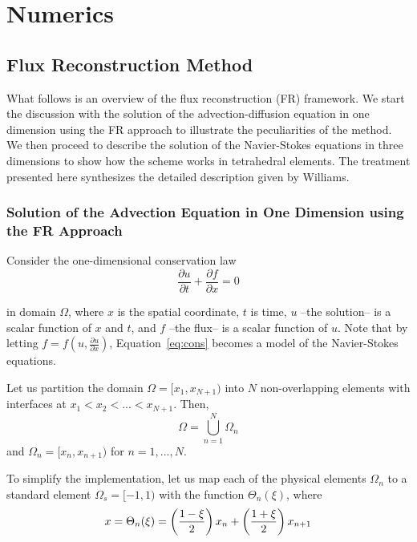
\section{Numerics}
\label{sec:numerics}
\subsection{Flux Reconstruction Method}

What follows is an overview of the flux reconstruction (FR) framework. We start the discussion with the solution of the advection-diffusion equation in one dimension using the FR approach to illustrate the peculiarities of the method. We then proceed to describe the solution of the Navier-Stokes equations in  three dimensions to show how the scheme works in tetrahedral elements. The treatment presented here synthesizes the detailed description given by Williams\cite{williams2013thesis}.

\subsubsection{Solution of the Advection Equation in One Dimension using the FR Approach}

Consider the one-dimensional conservation law
\begin{equation}
\label{eq:cons}
\frac{\partial u}{\partial t} + \frac{\partial f}{\partial x} = 0
\end{equation}

in domain $\Omega$, where $x$ is the spatial coordinate, $t$ is time, $u$ --the solution-- is a scalar function of $x$ and $t$, and $f$ --the flux-- is a scalar function of $u$. Note that by letting $f = f(u,\frac{\partial u}{\partial x})$, Equation~\ref{eq:cons} becomes a model of the Navier-Stokes equations.

Let us partition the domain $\Omega = [x_1,x_{N+1})$ into $N$ non-overlapping elements with 
interfaces at $x_1<x_2<...<x_{N+1}$. Then,
\begin{equation}
\Omega = \bigcup^N_{n=1} \Omega_n
\end{equation}
and $\Omega_n = [x_n,x_{n+1})$ for $n = 1,...,N$.

To simplify the implementation, let us map each of the physical elements $\Omega_n$ to a standard 
element $\Omega_s=[-1,1)$ with the function $\Theta_n(\xi)$, where
\begin{equation}
x = \Theta_n(\xi) = \left( \frac{1-\xi}{2} \right) x_n + \left(\frac{1+\xi}{2}\right) x_{n+1} 
\end{equation}

